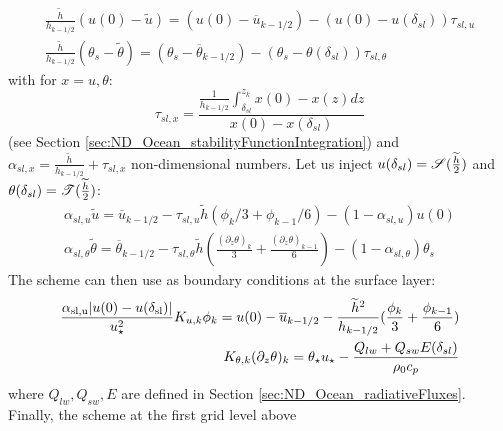 \begin{equation} \label{eq:ND_Ocean_tmprelation_tilde_bar}
\begin{aligned}
	\frac{\widetilde{h}}{h_{k-1/2}} (u(0) - \widetilde{u}) =
	(u(0) - \overline{u}_{k-1/2}) -
	(u(0) - u(\delta_{sl}))\tau_{sl, u} \\
\frac{\widetilde{h}}{h_{k-1/2}} (\theta_s - \widetilde{\theta}) =
	(\theta_s - \overline{\theta}_{k-1/2}) -
	(\theta_s - \theta(\delta_{sl}))\tau_{sl, \theta}
\end{aligned}
\end{equation}
with for $x = u, \theta$:
\begin{equation}
	\tau_{sl, x} = \frac{\frac{1}{{h_{k-1/2}}}\int_{\delta_{sl}}^{z_k} x(0) - x(z)
	dz}{x(0) - x(\delta_{sl})}
\end{equation} (see Section
\ref{sec:ND_Ocean_stabilityFunctionIntegration})
and
$\alpha_{sl, x} = \frac{\widetilde{h}}{h_{k-1/2}} +
\tau_{sl, x}$
non-dimensional numbers.
Let us inject $u(\delta_{sl}) =
{\cal S}(\frac{\widetilde{h}}{2})$ and
$\theta(\delta_{sl}) = {\cal T}(\frac{\widetilde{h}}{2})$:
\begin{equation}
\begin{aligned}
\label{eq:ND_Ocean_relation_tilde_bar}
\alpha_{sl, u}\widetilde{u} = \overline{u}_{k-1/2} -
	\tau_{sl, u}
\widetilde{h}
	(\phi_k/3 + \phi_{k-1}/6) - (1 - \alpha_{sl, u})u(0)\\
\alpha_{sl, \theta}
\widetilde{\theta}
= \overline{\theta}_{k-1/2} - \tau_{sl, \theta}
	\widetilde{h}(\frac{{(\partial_z \theta)}_k}{3} + \frac{{(\partial_z \theta)}_{k-1}}{6})
 - (1 - \alpha_{sl, \theta})\theta_s
\end{aligned}
\end{equation}
The scheme can then use as boundary conditions at the surface layer:
\begin{equation}
\label{eq:ND_Ocean_boundaryConditionFVfree}
\begin{aligned}
	\frac{\alpha_{\rm sl, u} |u(0) - u(\delta_{\rm sl})|}
	{u_\star^2}K_{u,k} \phi_k =
	u(0) - \overline{u}_{k-1/2} - \frac{\widetilde{h}^2}{h_{k-1/2}}
	(\frac{\phi_k}{3} + \frac{\phi_{k-1}}{6})
	\\
	K_{\theta, k} (\partial_z \theta)_k = 
	\theta_\star u_\star - \frac{Q_{lw} + Q_{sw}E(\delta_{sl})}{\rho_0 c_p}
  \end{aligned}
\end{equation}
where $Q_{lw}, Q_{sw}, E$ are defined in Section
\ref{sec:ND_Ocean_radiativeFluxes}.
Finally, the scheme at the first grid level above
